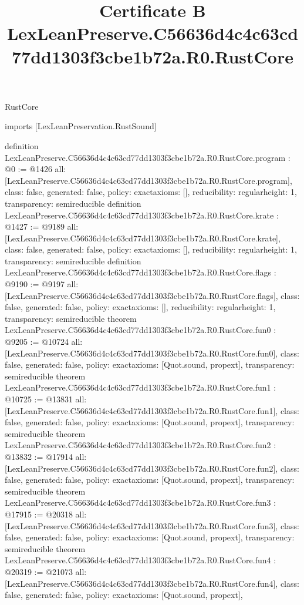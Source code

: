 \begin{lexlean}{RustCore}
\title{Certificate B LexLeanPreserve.C56636d4c4c63cd77dd1303f3cbe1b72a.R0.RustCore}
\begin{coremodule}
imports [LexLeanPreservation.RustSound]

definition LexLeanPreserve.C56636d4c4c63cd77dd1303f3cbe1b72a.R0.RustCore.program : @0 := @1426 {
  all: [LexLeanPreserve.C56636d4c4c63cd77dd1303f3cbe1b72a.R0.RustCore.program],
  class: false,
  generated: false,
  policy: exact{axioms: []},
  reducibility: regular{height: 1},
  transparency: semireducible
}
definition LexLeanPreserve.C56636d4c4c63cd77dd1303f3cbe1b72a.R0.RustCore.krate : @1427 := @9189 {
  all: [LexLeanPreserve.C56636d4c4c63cd77dd1303f3cbe1b72a.R0.RustCore.krate],
  class: false,
  generated: false,
  policy: exact{axioms: []},
  reducibility: regular{height: 1},
  transparency: semireducible
}
definition LexLeanPreserve.C56636d4c4c63cd77dd1303f3cbe1b72a.R0.RustCore.flags : @9190 := @9197 {
  all: [LexLeanPreserve.C56636d4c4c63cd77dd1303f3cbe1b72a.R0.RustCore.flags],
  class: false,
  generated: false,
  policy: exact{axioms: []},
  reducibility: regular{height: 1},
  transparency: semireducible
}
theorem LexLeanPreserve.C56636d4c4c63cd77dd1303f3cbe1b72a.R0.RustCore.fun0 : @9205 := @10724 {
  all: [LexLeanPreserve.C56636d4c4c63cd77dd1303f3cbe1b72a.R0.RustCore.fun0],
  class: false,
  generated: false,
  policy: exact{axioms: [Quot.sound, propext]},
  transparency: semireducible
}
theorem LexLeanPreserve.C56636d4c4c63cd77dd1303f3cbe1b72a.R0.RustCore.fun1 : @10725 := @13831 {
  all: [LexLeanPreserve.C56636d4c4c63cd77dd1303f3cbe1b72a.R0.RustCore.fun1],
  class: false,
  generated: false,
  policy: exact{axioms: [Quot.sound, propext]},
  transparency: semireducible
}
theorem LexLeanPreserve.C56636d4c4c63cd77dd1303f3cbe1b72a.R0.RustCore.fun2 : @13832 := @17914 {
  all: [LexLeanPreserve.C56636d4c4c63cd77dd1303f3cbe1b72a.R0.RustCore.fun2],
  class: false,
  generated: false,
  policy: exact{axioms: [Quot.sound, propext]},
  transparency: semireducible
}
theorem LexLeanPreserve.C56636d4c4c63cd77dd1303f3cbe1b72a.R0.RustCore.fun3 : @17915 := @20318 {
  all: [LexLeanPreserve.C56636d4c4c63cd77dd1303f3cbe1b72a.R0.RustCore.fun3],
  class: false,
  generated: false,
  policy: exact{axioms: [Quot.sound, propext]},
  transparency: semireducible
}
theorem LexLeanPreserve.C56636d4c4c63cd77dd1303f3cbe1b72a.R0.RustCore.fun4 : @20319 := @21073 {
  all: [LexLeanPreserve.C56636d4c4c63cd77dd1303f3cbe1b72a.R0.RustCore.fun4],
  class: false,
  generated: false,
  policy: exact{axioms: [Quot.sound, propext]},
}
\end{coremodule}
\end{lexlean}

